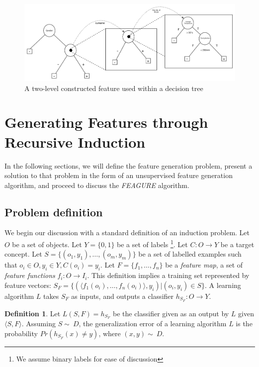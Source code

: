 \documentclass{article}
\theoremstyle{definition}
\newtheorem{defn}{Definition}[section]
\begin{document}
\begin{figure}[th]
	\centering
	\includegraphics[width=\linewidth]{fig3.pdf}
	\caption{A two-level constructed feature used within a decision tree}
	\label{fig:lvl2_tree}
\end{figure}

\section{Generating Features through Recursive Induction} \label{formal}

In the following sections, we will define the feature generation problem, present a solution to that problem in the form of an unsupervised feature generation algorithm, and proceed to discuss the \emph{FEAGURE} algorithm. %

\subsection{Problem definition}

We begin our discussion with a standard definition of an induction problem. 
Let $O$ be a set of objects. Let $Y=\{0,1\}$ be a set of labels \footnote{We assume binary labels for ease of discussion}. Let $C:O\rightarrow Y$ be a target concept. Let $S=\{(o_{1},y_{1}),\ldots,(o_{m},y_{m})\}$ be a set of labelled examples such that $o_{i}\in O, y_{i}\in Y, C(o_i)=y_i$. 
Let $F=\{f_{1},\ldots,f_{n}\}$ be a \emph{feature map}, a set of \emph{feature functions} $f_{i}:O\rightarrow I_{i}$.  This definition implies a training set represented by feature vectors: $S_F=\{ (\langle f_1(o_i),\ldots,f_n(o_i)\rangle, y_i) | (o_i,y_i) \in S\}$. A learning algorithm $L$ takes $S_F$ as inputs, and outputs a classifier $h_{S_F}:O\rightarrow Y$.
\begin{defn}
	Let $L(S,F)=h_{S_F}$ be the classifier given as an output by $L$ given $\langle S,F\rangle$. Assuming $S\sim\ D$, the generalization error of a learning algorithm $L$ is the probability $Pr(h_{S_F}(x)\neq y)$, where $(x,y)\sim\ D$.
\end{defn}
\end{document}
